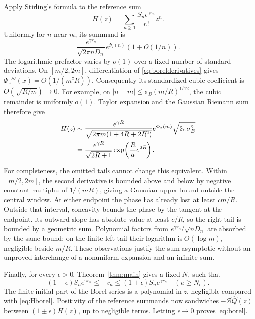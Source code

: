 \documentclass[11pt,a4paper]{article}
\numberwithin{equation}{section}
\theoremstyle{definition}\newtheorem{definition}[theorem]{Definition}
\theoremstyle{remark}\newtheorem{remark}[theorem]{Remark}
\theoremstyle{definition}
\newcommand{\Q}{\widehat Q}
\newcommand{\Bcal}{\mathcal B}
\newcommand{\abs}[1]{\left|#1\right|}
\begin{document}
Apply Stirling's formula to the reference sum
\begin{equation}
 H(z)=\sum_{n\ge1}\frac{S_ne^{\gamma r_n}}{n!}z^n.
 \label{eq:referenceborel}
\end{equation}
Uniformly for \(n\) near \(m\), its summand is
\[
 \frac{e^{\gamma r_n}}{\sqrt{2\pi nD_n}}
 e^{\Phi_z(n)}(1+O(1/n)).
\]
The logarithmic prefactor varies by \(o(1)\) over a fixed number of
standard deviations. On \([m/2,2m]\), differentiation of
\eqref{eq:borelderivatives} gives
\(\Phi_z'''(x)=O(1/(m^2R))\). Consequently its standardized cubic
coefficient is \(O(\sqrt{R/m})\to0\).
For example, on
\(\abs{n-m}\le\sigma_B(m/R)^{1/12}\), the cubic remainder is uniformly
\(o(1)\). Taylor expansion and the Gaussian Riemann sum therefore give
\begin{align}
 H(z)&\sim
 \frac{e^{\gamma R}}{\sqrt{2\pi m(1+4R+2R^2)}}
 e^{\Phi_z(m)}\sqrt{2\pi\sigma_B^2}\notag\\
 &=\frac{e^{\gamma R}}{\sqrt{2R+1}}
   \exp\!\left(\frac Ra e^{2R}\right).
 \label{eq:Hborel}
\end{align}

For completeness, the omitted tails cannot change this equivalent.
Within \([m/2,2m]\), the second derivative is bounded above and below by
negative constant multiples of \(1/(mR)\), giving a Gaussian upper bound
outside the central window. At either endpoint the phase has already lost
at least \(cm/R\). Outside that interval, concavity bounds the phase by
the tangent at the endpoint. Its outward slope has absolute value at least
\(c/R\), so the right tail is bounded by a geometric sum. Polynomial
factors from \(e^{\gamma r_n}/\sqrt{nD_n}\) are absorbed by the same bound;
on the finite left tail their logarithm is \(O(\log m)\), negligible
beside \(m/R\). These observations justify the sum asymptotic without an
unproved interchange of a nonuniform expansion and an infinite sum.

Finally, for every \(\epsilon>0\), Theorem~\ref{thm:main} gives a fixed
\(N_\epsilon\) such that
\[
 (1-\epsilon)S_ne^{\gamma r_n}
 \le -v_n\le(1+\epsilon)S_ne^{\gamma r_n}
 \quad(n\ge N_\epsilon).
\]
The finite initial part of the Borel series is a polynomial in \(z\),
negligible compared with \eqref{eq:Hborel}. Positivity of the reference
summands now sandwiches \(-\Bcal\Q(z)\) between
\((1\pm\epsilon)H(z)\), up to negligible terms. Letting \(\epsilon\to0\)
proves \eqref{eq:borel}.
\end{document}
